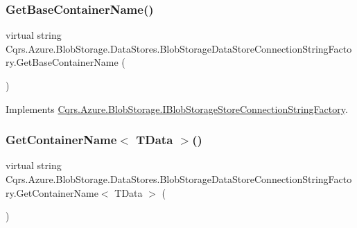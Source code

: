 \subsubsection{\texorpdfstring{Get\+Base\+Container\+Name()}{GetBaseContainerName()}}
{\footnotesize\ttfamily virtual string Cqrs.\+Azure.\+Blob\+Storage.\+Data\+Stores.\+Blob\+Storage\+Data\+Store\+Connection\+String\+Factory.\+Get\+Base\+Container\+Name (\begin{DoxyParamCaption}{ }\end{DoxyParamCaption})\hspace{0.3cm}{\ttfamily [virtual]}}



Implements \hyperlink{interfaceCqrs_1_1Azure_1_1BlobStorage_1_1IBlobStorageStoreConnectionStringFactory_a57145e68e3bda84bc610fa61226a850c_a57145e68e3bda84bc610fa61226a850c}{Cqrs.\+Azure.\+Blob\+Storage.\+I\+Blob\+Storage\+Store\+Connection\+String\+Factory}.

\mbox{\label{classCqrs_1_1Azure_1_1BlobStorage_1_1DataStores_1_1BlobStorageDataStoreConnectionStringFactory_a20374b5e2e77a593da164d3eb42b2a0a_a20374b5e2e77a593da164d3eb42b2a0a}} 
\subsubsection{\texorpdfstring{Get\+Container\+Name$<$ T\+Data $>$()}{GetContainerName< TData >()}}
{\footnotesize\ttfamily virtual string Cqrs.\+Azure.\+Blob\+Storage.\+Data\+Stores.\+Blob\+Storage\+Data\+Store\+Connection\+String\+Factory.\+Get\+Container\+Name$<$ T\+Data $>$ (\begin{DoxyParamCaption}{ }\end{DoxyParamCaption})\hspace{0.3cm}{\ttfamily [virtual]}}




